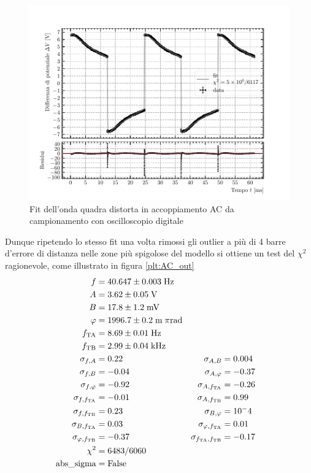 \documentclass{article}[a4paper, oneside ,11pt]
\begin{document}
\begin{figure}[!htb]
	\centering 
 		\includegraphics[scale=0.9]{./DSOAC.pdf}
 	\caption{Fit dell'onda quadra distorta in accoppiamento AC da campionamento con oscilloscopio digitale\label{plt:DSOAC}}
\end{figure}
Dunque ripetendo lo stesso fit una volta rimossi gli outlier a più di 4 barre d'errore di distanza nelle zone più spigolose del modello si ottiene un test del $\chi^2$ ragionevole, come illustrato in figura \ref{plt:AC_out}
\begin{align*}
f &= 40.647 \pm 0.003 \; \rm Hz \\
A &= 3.62 \pm 0.05 \; \rm V \\
B &= 17.8 \pm 1.2 \; \rm mV \\
\varphi &= 1996.7 \pm 0.2 \; \mathrm{m}\; \pi \si{\radian} \\
f_{\rm TA} &= 8.69 \pm 0.01 \; \rm Hz \\
f_{\rm TB} &= 2.99 \pm 0.04 \; \si{\kilo\hertz} \\
\sigma_{f, A} &= 0.22 \qquad &\sigma_{A, B} &= 0.004 \\
\sigma_{f, B} &= -0.04 \qquad &\sigma_{A, \varphi} &= -0.37 \\
\sigma_{f, \varphi} &= -0.92 \qquad &\sigma_{A, f_{\rm TA}} &= -0.26 \\
\sigma_{f, f_{\rm TA}} &= -0.01 \qquad &\sigma_{A, f_{\rm TB}} &= 0.99 \\
\sigma_{f, f_{\rm TB}} &= 0.23 \qquad &\sigma_{B, \varphi} &= 10^-4 \\
\sigma_{B, f_{\rm TA}} &= 0.03 \qquad &\sigma_{\varphi, f_{\rm TA}} &= 0.01 \\
\sigma_{\varphi, f_{\rm TB}} &= -0.37 \qquad &\sigma_{f_{\rm TA}, f_{\rm TB}} &= -0.17 \\
\chi^2 &= 6483/6060 \\
\text{abs\_sigma} &= \rm False
\end{align*}
\end{document}

